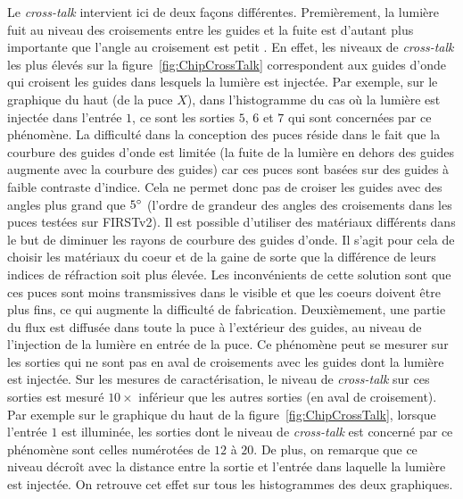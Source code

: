 Le \textit{cross-talk} intervient ici de deux façons différentes. Premièrement, la lumière fuit au niveau des croisements entre les guides et la fuite est d'autant plus importante que l'angle au croisement est petit \citep{labeye2008}. En effet, les niveaux de \textit{cross-talk} les plus élevés sur la figure~\ref{fig:ChipCrossTalk} correspondent aux guides d'onde qui croisent les guides dans lesquels la lumière est injectée. Par exemple, sur le graphique du haut (de la puce $X$), dans l'histogramme du cas où la lumière est injectée dans l'entrée $1$, ce sont les sorties $5$, $6$ et $7$ qui sont concernées par ce phénomène. La difficulté dans la conception des puces réside dans le fait que la courbure des guides d'onde est limitée (la fuite de la lumière en dehors des guides augmente avec la courbure des guides) car ces puces sont basées sur des guides à faible contraste d'indice. Cela ne permet donc pas de croiser les guides avec des angles plus grand que $5^{\circ}$ (l'ordre de grandeur des angles des croisements dans les puces testées sur \ac{FIRSTv2}). Il est possible d'utiliser des matériaux différents dans le but de diminuer les rayons de courbure des guides d'onde. Il s'agit pour cela de choisir les matériaux du coeur et de la gaine de sorte que la différence de leurs indices de réfraction soit plus élevée. Les inconvénients de cette solution sont que ces puces sont moins transmissives dans le visible et que les coeurs doivent être plus fins, ce qui augmente la difficulté de fabrication. Deuxièmement, une partie du flux est diffusée dans toute la puce à l'extérieur des guides, au niveau de l'injection de la lumière en entrée de la puce. Ce phénomène peut se mesurer sur les sorties qui ne sont pas en aval de croisements avec les guides dont la lumière est injectée. Sur les mesures de caractérisation, le niveau de \textit{cross-talk} sur ces sorties est mesuré $10 \times$ inférieur que les autres sorties (en aval de croisement). Par exemple sur le graphique du haut de la figure~\ref{fig:ChipCrossTalk}, lorsque l'entrée $1$ est illuminée, les sorties dont le niveau de \textit{cross-talk} est concerné par ce phénomène sont celles numérotées de $12$ à $20$. De plus, on remarque que ce niveau décroît avec la distance entre la sortie et l'entrée dans laquelle la lumière est injectée. On retrouve cet effet sur tous les histogrammes des deux graphiques.

